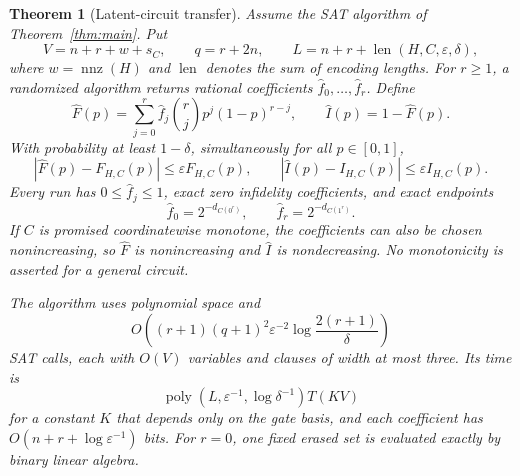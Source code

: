 \documentclass[11pt]{article}
\newtheorem{theorem}{Theorem}
\theoremstyle{remark}
\newcommand{\poly}{\operatorname{poly}}
\newcommand{\eps}{\varepsilon}
\begin{document}
\begin{theorem}[Latent-circuit transfer]\label{thm:latent}
Assume the SAT algorithm of Theorem~\ref{thm:main}. Put
\[
 V=n+r+w+s_C,\qquad q=r+2n,\qquad
 L=n+r+\operatorname{len}(H,C,\eps,\delta),
\]
where \(w=\operatorname{nnz}(H)\) and \(\operatorname{len}\) denotes
the sum of encoding lengths. For \(r\ge1\), a randomized algorithm
returns rational coefficients \(\widehat f_0,\ldots,\widehat f_r\).
Define
\[
 \widehat F(p)=\sum_{j=0}^r\widehat f_j\binom rj p^j(1-p)^{r-j},
 \qquad \widehat I(p)=1-\widehat F(p).
\]
With probability at least \(1-\delta\), simultaneously for all
\(p\in[0,1]\),
\[
 |\widehat F(p)-F_{H,C}(p)|\le\eps F_{H,C}(p),\qquad
 |\widehat I(p)-I_{H,C}(p)|\le\eps I_{H,C}(p).
\]
Every run has \(0\le\widehat f_j\le1\), exact zero infidelity
coefficients, and exact endpoints
\[
 \widehat f_0=2^{-d_{C(0^r)}},\qquad
 \widehat f_r=2^{-d_{C(1^r)}}.
\]
If \(C\) is promised coordinatewise monotone, the coefficients can
also be chosen nonincreasing, so \(\widehat F\) is nonincreasing
and \(\widehat I\) is nondecreasing. No monotonicity is asserted
for a general circuit.

The algorithm uses polynomial space and
\[
 O\!\left((r+1)(q+1)^2\eps^{-2}
       \log\frac{2(r+1)}{\delta}\right)
\]
SAT calls, each with \(O(V)\) variables and clauses of width at most
three. Its time is
\[
 \poly(L,\eps^{-1},\log\delta^{-1})T(KV)
\]
for a constant \(K\) that depends only on the gate basis, and each
coefficient has
\(O(n+r+\log\eps^{-1})\) bits.
For \(r=0\), one fixed erased set is evaluated exactly by binary
linear algebra.
\end{theorem}
\end{document}
